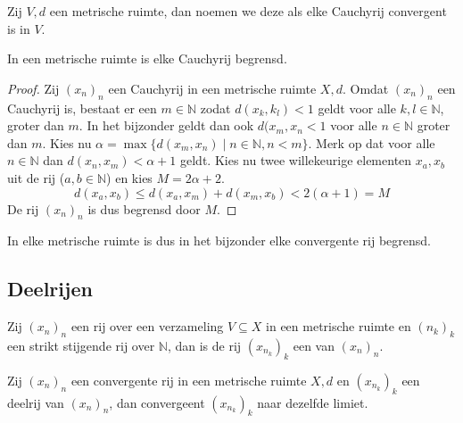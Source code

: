 \documentclass[main.tex]{subfiles}
\begin{document}
\begin{de}
  \label{de:metrische-ruimte-volledig}
  Zij $V,d$ een metrische ruimte, dan noemen we deze  als elke Cauchyrij convergent is in $V$.
\end{de}

\begin{st}
  In een metrische ruimte is elke Cauchyrij begrensd.

  \begin{proof}
    Zij $(x_{n})_{n}$ een Cauchyrij in een metrische ruimte $X,d$.
    Omdat $(x_{n})_{n}$ een Cauchyrij is, bestaat er een $m\in \mathbb{N}$ zodat $d(x_{k},k_{l}) < 1$ geldt voor alle $k,l \in \mathbb{N}$, groter dan $m$.
    In het bijzonder geldt dan ook $d(x_{m},x_{n} < 1$ voor alle $n\in \mathbb{N}$ groter dan $m$.
    Kies nu $\alpha = \max\{ d(x_{m},x_{n}) \mid n\in \mathbb{N}, n < m \}$.
    Merk op dat voor alle $n\in \mathbb{N}$ dan $d(x_{n},x_{m}) < \alpha + 1$ geldt.
    Kies nu twee willekeurige elementen $x_{a},x_{b}$ uit de rij ($a,b\in \mathbb{N}$) en kies $M=2\alpha+2$.
    \[ d(x_{a},x_{b}) \le d(x_{a},x_{m}) + d(x_{m},x_{b}) < 2(\alpha+1) = M \]
    De rij $(x_{n})_{n}$ is dus begrensd door $M$.
  \end{proof}
\end{st}

\begin{gev}
  In elke metrische ruimte is dus in het bijzonder elke convergente rij begrensd.
\end{gev}

\subsection{Deelrijen}
\label{sec:deelrijen}

\begin{de}
  Zij $(x_{n})_{n}$ een rij over een verzameling $V\subseteq X$ in een metrische ruimte en $(n_{k})_{k}$ een strikt stijgende rij over $\mathbb{N}$, dan is de rij $(x_{n_{k}})_{k}$ een  van $(x_{n})_{n}$.
\end{de}

\begin{st}
  \label{st:deelrij-zelfde-limiet-als-convergente-moederrij}
  Zij $(x_{n})_{n}$ een convergente rij in een metrische ruimte $X,d$ en $(x_{n_{k}})_{k}$ een deelrij van $(x_{n})_{n}$, dan convergeent $(x_{n_{k}})_{k}$ naar dezelfde limiet.
\end{st}
\end{document}
